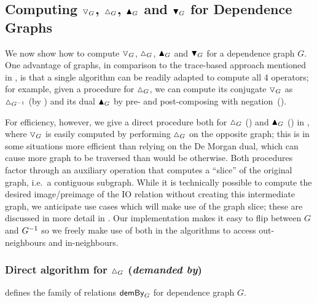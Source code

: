 \subsection{Computing $\triangledown_G$, $\demandedByR_G$, $\blacktriangle_{G}$ and $\blacktriangledown_{G}$ for
Dependence Graphs}
\label{sec:conjugate:dependence-graph-algos}

We now show how to compute $\triangledown_{G}$, $\demandedByR_{G}$, $\blacktriangle_{G}$ and $\blacktriangledown_{G}$ for
a dependence graph $G$.  One advantage of graphs, in
comparison to the trace-based approach mentioned in , is that a single algorithm can be
readily adapted to compute all 4 operators; for example, given a procedure for $\demandedByR_{G}$, we can
compute its conjugate $\triangledown_{G}$ as $\demandedByR_{\opGraph{G}}$ (by
) and its dual $\blacktriangle_{G}$ by pre- and post-composing with
negation~().

For efficiency, however, we give a direct procedure both for $\demandedByR_{G}$
() and $\blacktriangle_{G}$ ()  in
, where $\triangledown_G$ is easily computed by performing  $\demandedByR_{G}$ on the
opposite graph; this is in some situations more efficient than relying on the De Morgan dual, which can cause
more graph to be traversed than would be otherwise. Both procedures factor through an auxiliary operation that
computes a ``slice'' of the original graph, i.e.~a contiguous subgraph. While it is technically possible to
compute the desired image/preimage of the IO relation without creating this intermediate graph, we anticipate
use cases which will make use of the graph slice; these are discussed in more detail in .
Our implementation makes it easy to flip between $G$ and $G^{-1}$ so we freely make use of both in the
algorithms to access out-neighbours and in-neighbours.

\subsubsection{Direct algorithm for $\demandedByR_{G}$ (\emph{demanded by})}
\label{sec:conjugate:algorithm:demandedBy}

\begin{definition}[$\demandedByAlg{G}$]
\label{def:conjugate:algorithm:demandedBy}
 defines the family of relations $\demandedByAlg{G}$ for dependence graph $G$.
\end{definition}

